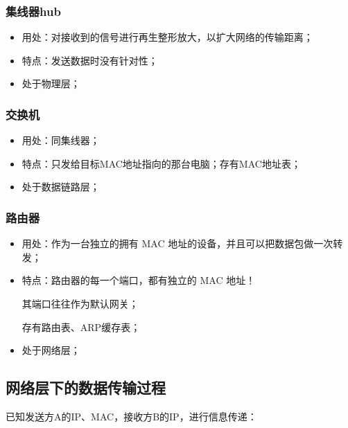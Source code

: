 \documentclass[UTF8]{article}%
\begin{document}
\subsubsection{集线器hub}

\begin{itemize}
    \item 用处：对接收到的信号进行再生整形放大，以扩大网络的传输距离；
    \item 特点：发送数据时没有针对性；
    \item 处于物理层；
\end{itemize}

\subsubsection{交换机}

\begin{itemize}
    \item 用处：同集线器；
    \item 特点：只发给目标MAC地址指向的那台电脑；存有MAC地址表；
    \item 处于数据链路层；
\end{itemize}

\subsubsection{路由器}

\begin{itemize}
    \item 用处：作为一台独立的拥有 MAC 地址的设备，并且可以把数据包做一次转发；
    \item 特点：路由器的每一个端口，都有独立的 MAC 地址！

            其端口往往作为默认网关；

            存有路由表、ARP缓存表；

    \item 处于网络层；
\end{itemize}

\subsection{网络层下的数据传输过程}

已知发送方A的IP、MAC，接收方B的IP，进行信息传递：
\end{document}
